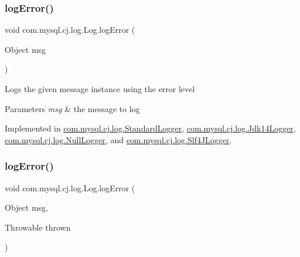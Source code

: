 \mbox{\label{interfacecom_1_1mysql_1_1cj_1_1log_1_1_log_ab6f35d1efab89f0c0316106fa4a15d2c}} 
\subsubsection{\texorpdfstring{log\+Error()}{logError()}\hspace{0.1cm}{\footnotesize\ttfamily [1/2]}}
{\footnotesize\ttfamily void com.\+mysql.\+cj.\+log.\+Log.\+log\+Error (\begin{DoxyParamCaption}\item[{Object}]{msg }\end{DoxyParamCaption})}

Logs the given message instance using the \textquotesingle{}error\textquotesingle{} level


\begin{DoxyParams}{Parameters}
{\em msg} & the message to log \\
\hline
\end{DoxyParams}


Implemented in \mbox{\hyperlink{classcom_1_1mysql_1_1cj_1_1log_1_1_standard_logger_a190ac11ebc3b482ff9016af3e9a14ca4}{com.\+mysql.\+cj.\+log.\+Standard\+Logger}}, \mbox{\hyperlink{classcom_1_1mysql_1_1cj_1_1log_1_1_jdk14_logger_ab800a4f68be1be1e0e90581ea6239506}{com.\+mysql.\+cj.\+log.\+Jdk14\+Logger}}, \mbox{\hyperlink{classcom_1_1mysql_1_1cj_1_1log_1_1_null_logger_aa955e1f3a7fa6eaa275d60833b56ce79}{com.\+mysql.\+cj.\+log.\+Null\+Logger}}, and \mbox{\hyperlink{classcom_1_1mysql_1_1cj_1_1log_1_1_slf4_j_logger_a1a99e9a4f586e0678a68d1145cd26bc5}{com.\+mysql.\+cj.\+log.\+Slf4\+J\+Logger}}.

\mbox{\label{interfacecom_1_1mysql_1_1cj_1_1log_1_1_log_a96aab6e63a2ab9ebe3b640b7e253dd4f}} 
\subsubsection{\texorpdfstring{log\+Error()}{logError()}\hspace{0.1cm}{\footnotesize\ttfamily [2/2]}}
{\footnotesize\ttfamily void com.\+mysql.\+cj.\+log.\+Log.\+log\+Error (\begin{DoxyParamCaption}\item[{Object}]{msg,  }\item[{Throwable}]{thrown }\end{DoxyParamCaption})}

